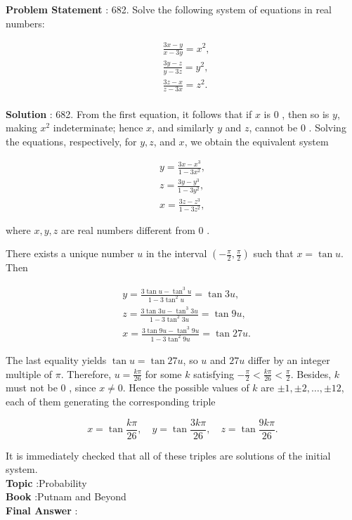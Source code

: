\documentclass[10pt]{article}
\begin{document}
\textbf{Problem Statement} :
682. Solve the following system of equations in real numbers:

$$
\begin{aligned}
&\frac{3 x-y}{x-3 y}=x^{2}, \\
&\frac{3 y-z}{y-3 z}=y^{2}, \\
&\frac{3 z-x}{z-3 x}=z^{2} .
\end{aligned}
$$
\\
\textbf{Solution} :
682. From the first equation, it follows that if $x$ is 0 , then so is $y$, making $x^{2}$ indeterminate; hence $x$, and similarly $y$ and $z$, cannot be 0 . Solving the equations, respectively, for $y, z$, and $x$, we obtain the equivalent system

$$
\begin{gathered}
y=\frac{3 x-x^{3}}{1-3 x^{2}}, \\
z=\frac{3 y-y^{3}}{1-3 y^{2}}, \\
x=\frac{3 z-z^{3}}{1-3 z^{2}},
\end{gathered}
$$

where $x, y, z$ are real numbers different from 0 .

There exists a unique number $u$ in the interval $\left(-\frac{\pi}{2}, \frac{\pi}{2}\right)$ such that $x=\tan u$. Then

$$
\begin{aligned}
&y=\frac{3 \tan u-\tan ^{3} u}{1-3 \tan ^{2} u}=\tan 3 u, \\
&z=\frac{3 \tan 3 u-\tan ^{3} 3 u}{1-3 \tan ^{2} 3 u}=\tan 9 u, \\
&x=\frac{3 \tan 9 u-\tan ^{3} 9 u}{1-3 \tan ^{2} 9 u}=\tan 27 u .
\end{aligned}
$$

The last equality yields $\tan u=\tan 27 u$, so $u$ and $27 u$ differ by an integer multiple of $\pi$. Therefore, $u=\frac{k \pi}{26}$ for some $k$ satisfying $-\frac{\pi}{2}<\frac{k \pi}{26}<\frac{\pi}{2}$. Besides, $k$ must not be 0 , since $x \neq 0$. Hence the possible values of $k$ are $\pm 1, \pm 2, \ldots, \pm 12$, each of them generating the corresponding triple

$$
x=\tan \frac{k \pi}{26}, \quad y=\tan \frac{3 k \pi}{26}, \quad z=\tan \frac{9 k \pi}{26} .
$$

It is immediately checked that all of these triples are solutions of the initial system.
\\
\textbf{Topic} :Probability\\
\textbf{Book} :Putnam and Beyond\\
\textbf{Final Answer} :\\
\end{document}
